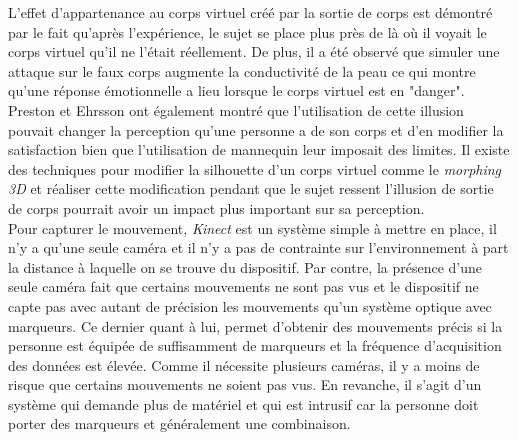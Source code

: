 \documentclass[11pt]{article}
\begin{document}
L'effet d'appartenance au corps virtuel créé par la sortie de corps est démontré par le fait qu'après l'expérience, le sujet se place plus près de là où il voyait le corps virtuel qu'il ne l'était réellement. De plus, il a été observé que simuler une attaque sur le faux corps augmente la conductivité de la peau ce qui montre qu'une réponse émotionnelle a lieu lorsque le corps virtuel est en "danger". Preston et Ehrsson \cite{pr14} ont également montré que l'utilisation de cette illusion pouvait changer la perception qu'une personne a de son corps et d'en modifier la satisfaction bien que l'utilisation de mannequin leur imposait des limites. Il existe des techniques pour modifier la silhouette d'un corps virtuel comme le \emph{morphing 3D} et réaliser cette modification pendant que le sujet ressent l'illusion de sortie de corps pourrait avoir un impact plus important sur sa perception.\\

Pour capturer le mouvement, \emph{Kinect} est un système simple à mettre en place, il n'y a qu'une seule caméra et il n'y a pas de contrainte sur l'environnement à part la distance à laquelle on se trouve du dispositif. Par contre, la présence d'une seule caméra fait que certains mouvements ne sont pas vus et le dispositif ne capte pas avec autant de précision les mouvements qu'un système optique avec marqueurs. Ce dernier quant à lui, permet d'obtenir des mouvements précis si la personne est équipée de suffisamment de marqueurs et la fréquence d'acquisition des données est élevée. Comme il nécessite plusieurs caméras, il y a moins de risque que certains mouvements ne soient pas vus. En revanche, il s'agit d'un système qui demande plus de matériel et qui est intrusif car la personne doit porter des marqueurs et généralement une combinaison.
\end{document}
